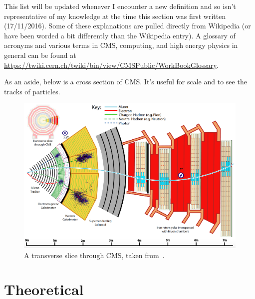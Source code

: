 This list will be updated whenever I encounter a new definition and so isn't representative of my knowledge at the time this section was first written (17/11/2016). Some of these explanations are pulled directly from Wikipedia (or have been worded a bit differently than the Wikipedia entry). A glossary of acronyms and various terms in CMS, computing, and high energy physics in general can be found at \url{https://twiki.cern.ch/twiki/bin/view/CMSPublic/WorkBookGlossary}.

As an aside, below is a cross section of CMS. It's useful for scale and to see the tracks of particles.

\begin{figure}[H]
\centering
\includegraphics[width=\textwidth]{./sec14/Transverse_slice_CMS.png}
\caption{A transverse slice through CMS, taken from~\cite{CMS-PRF-14-001}.}
\end{figure}


\section{Theoretical}

